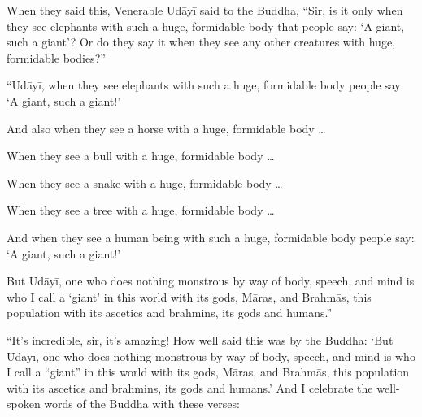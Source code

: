 \documentclass[12pt,openany]{book}%
\begin{document}
When they said this, Venerable \textsanskrit{Udāyī} said to the Buddha, “Sir, is it only when they see elephants with such a huge, formidable body that people say: ‘A giant, such a giant’? Or do they say it when they see any other creatures with huge, formidable bodies?” 

“\textsanskrit{Udāyī}, when they see elephants with such a huge, formidable body people say: ‘A giant, such a giant!’ 

And also when they see a horse with a huge, formidable body … 

When they see a bull with a huge, formidable body … 

When they see a snake with a huge, formidable body … 

When they see a tree with a huge, formidable body … 

And when they see a human being with such a huge, formidable body people say: ‘A giant, such a giant!’ 

But \textsanskrit{Udāyī}, one who does nothing monstrous by way of body, speech, and mind is who I call a ‘giant’ in this world with its gods, \textsanskrit{Māras}, and \textsanskrit{Brahmās}, this population with its ascetics and brahmins, its gods and humans.” 

“It’s incredible, sir, it’s amazing! How well said this was by the Buddha: ‘But \textsanskrit{Udāyī}, one who does nothing monstrous by way of body, speech, and mind is who I call a “giant” in this world with its gods, \textsanskrit{Māras}, and \textsanskrit{Brahmās}, this population with its ascetics and brahmins, its gods and humans.’ And I celebrate the well-spoken words of the Buddha with these verses: 
\end{document}
